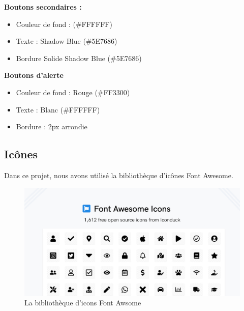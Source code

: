 \textbf{Boutons secondaires :}
\begin{itemize}
  \item Couleur de fond : (\#FFFFFF)

  \item Texte : Shadow Blue (\#5E7686)

  \item Bordure Solide Shadow Blue (\#5E7686)
\end{itemize}

\textbf{Boutons d'alerte}
\begin{itemize}
  \item Couleur de fond : Rouge (\#FF3300)

  \item Texte : Blanc (\#FFFFFF)

  \item Bordure : 2px arrondie
\end{itemize}










\subsection{Icônes}
\hspace{\parindent}Dans ce projet, nous avons utilisé la bibliothèque d'icônes Font Awesome.
\\
\begin{figure}[H]
  \centering
  \includegraphics[width=15cm]{Figures/icons.PNG}
  \caption{La bibliothèque d'icons Font Awsome}
\end{figure}











